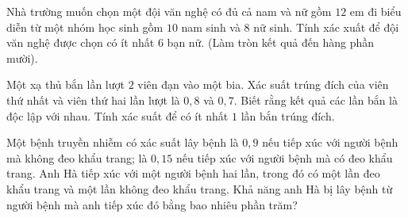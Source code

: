 \begin{ex}%
	Nhà trường muốn chọn một đội văn nghệ có đủ cả nam và nữ gồm $12$ em đi biểu diễn từ một nhóm học sinh gồm $10$ nam sinh và $8$ nữ sinh. Tính xác xuất để đội văn nghệ được chọn có ít nhất 6 bạn nữ. (Làm tròn kết quả đến hàng phần mười).
\end{ex}

\begin{ex}%
	Một xạ thủ bắn lần lượt $2$ viên đạn vào một bia. Xác suất trúng đích của viên thứ nhất và viên thứ hai lần lượt là $0{,}8$ và $0{,}7$. Biết rằng kết quả các lần bắn là độc lập với nhau. Tính xác suất  để có ít nhất $1$ lần bắn trúng đích.
\end{ex}
\begin{ex}%
	Một bệnh truyền nhiễm có xác suất lây bệnh là $0{,}9$ nếu tiếp xúc với người bệnh mà không đeo khẩu trang; là $0{,}15$ nếu tiếp xúc với người bệnh mà có đeo khẩu trang. Anh Hà tiếp xúc với một người bệnh hai lần, trong đó có một lần đeo khẩu trang và một lần không đeo khẩu trang. Khả năng anh Hà bị lây bệnh từ người bệnh mà anh tiếp xúc đó bằng bao nhiêu phần trăm?
\end{ex}

